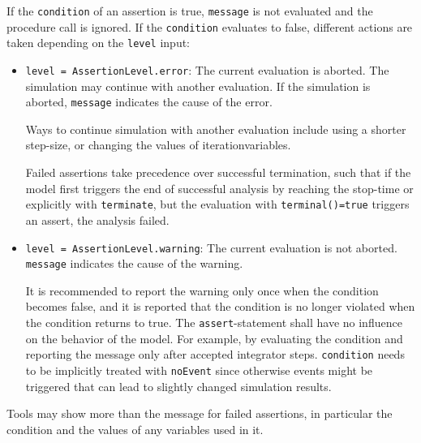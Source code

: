 If the \lstinline!condition! of an assertion is true, \lstinline!message! is not evaluated and the procedure call is ignored.
If the \lstinline!condition! evaluates to false, different actions are taken depending on the \lstinline!level! input:
\begin{itemize}
\item
  \lstinline!level = AssertionLevel.error!:
  The current evaluation is aborted.
  The simulation may continue with another evaluation.
  If the simulation is aborted, \lstinline!message! indicates the cause of the error.
  \begin{nonnormative}
  Ways to continue simulation with another evaluation include using a shorter step-size, or changing the values of iterationvariables.
  \end{nonnormative}
  Failed assertions take precedence over successful termination, such that if the model first triggers the end of successful analysis by reaching the stop-time or explicitly with \lstinline!terminate!, but the evaluation with \lstinline!terminal()=true! triggers an assert, the analysis failed.
\item
  \lstinline!level = AssertionLevel.warning!:
  The current evaluation is not aborted.
  \lstinline!message! indicates the cause of the warning.
  \begin{nonnormative}
  It is recommended to report the warning only once when the condition becomes false, and it is reported that the condition is no longer violated when the condition returns to true.
  The \lstinline!assert!-statement shall have no influence on the behavior of the model.
  For example, by evaluating the condition and reporting the message only after accepted integrator steps.
  \lstinline!condition! needs to be implicitly treated with \lstinline!noEvent! since otherwise events might be triggered that can lead to slightly changed simulation results.
  \end{nonnormative}
\end{itemize}
Tools may show more than the message for failed assertions, in particular the condition and the values of any variables used in it.

